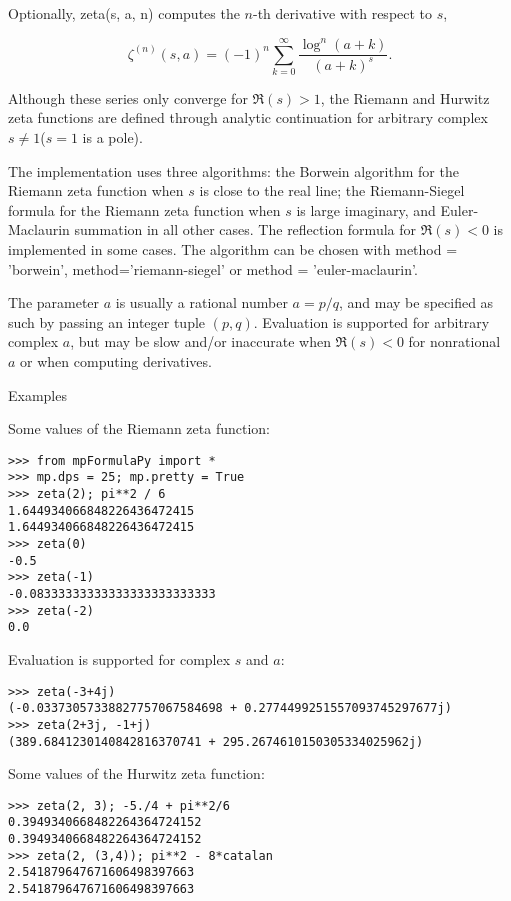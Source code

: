 Optionally, zeta(s, a, n) computes the $n$-th derivative with respect to $s$,

\begin{equation}
\zeta^{(n)}(s, a) = (-1)^n \sum_{k=0}^{\infty} \frac{\log^n(a+k)}{(a+k)^s}.
\end{equation}


Although these series only converge for $\Re(s)>1$, the Riemann and Hurwitz zeta functions are defined through analytic continuation for arbitrary complex $s \neq 1$($s=1$ is a pole).

\vpara
The implementation uses three algorithms: the Borwein algorithm for the Riemann zeta function when $s$ is close to the real line; the Riemann-Siegel formula for the Riemann zeta function when $s$ is large imaginary, and Euler-Maclaurin summation in all other cases. The reflection formula for $\Re(s) < 0$ is implemented in some cases. The algorithm can be chosen with method = 'borwein', method='riemann-siegel' or method = 'euler-maclaurin'.

\vpara
The parameter $a$ is usually a rational number $a=p/q$, and may be specified as such by passing an integer tuple $(p,q)$. Evaluation is supported for arbitrary complex $a$, but may be slow and/or inaccurate when $\Re(s) < 0$ for nonrational $a$ or when computing derivatives.

Examples

Some values of the Riemann zeta function:

\begin{lstlisting}
>>> from mpFormulaPy import *
>>> mp.dps = 25; mp.pretty = True
>>> zeta(2); pi**2 / 6
1.644934066848226436472415
1.644934066848226436472415
>>> zeta(0)
-0.5
>>> zeta(-1)
-0.08333333333333333333333333
>>> zeta(-2)
0.0
\end{lstlisting}

Evaluation is supported for complex $s$ and $a$:

\begin{lstlisting}
>>> zeta(-3+4j)
(-0.03373057338827757067584698 + 0.2774499251557093745297677j)
>>> zeta(2+3j, -1+j)
(389.6841230140842816370741 + 295.2674610150305334025962j)
\end{lstlisting}

Some values of the Hurwitz zeta function:

\begin{lstlisting}
>>> zeta(2, 3); -5./4 + pi**2/6
0.3949340668482264364724152
0.3949340668482264364724152
>>> zeta(2, (3,4)); pi**2 - 8*catalan
2.541879647671606498397663
2.541879647671606498397663
\end{lstlisting}



